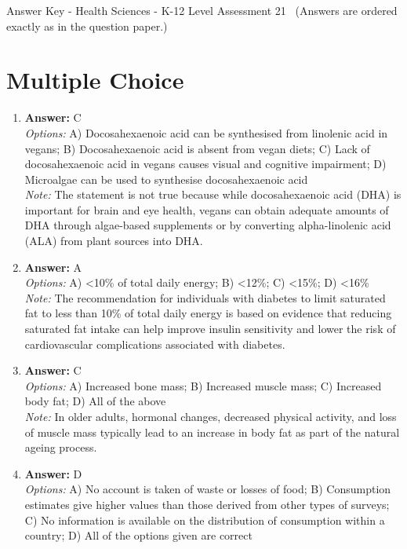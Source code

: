 \documentclass[12pt]{article}
\begin{document}
\begin{center}
Answer Key - Health Sciences - K-12 Level Assessment 21 \
\small (Answers are ordered exactly as in the question paper.)
\end{center}

\section*{Multiple Choice}
\begin{enumerate}[label=\arabic*.]
\item \textbf{Answer:} C
\\ \textit{Options:} A) Docosahexaenoic acid can be synthesised from linolenic acid in vegans; B) Docosahexaenoic acid is absent from vegan diets; C) Lack of docosahexaenoic acid in vegans causes visual and cognitive impairment; D) Microalgae can be used to synthesise docosahexaenoic acid
\\ \textit{Note:} The statement is not true because while docosahexaenoic acid (DHA) is important for brain and eye health, vegans can obtain adequate amounts of DHA through algae-based supplements or by converting alpha-linolenic acid (ALA) from plant sources into DHA.
\item \textbf{Answer:} A
\\ \textit{Options:} A) \textless{}10\% of total daily energy; B) \textless{}12\%; C) \textless{}15\%; D) \textless{}16\%
\\ \textit{Note:} The recommendation for individuals with diabetes to limit saturated fat to less than 10\% of total daily energy is based on evidence that reducing saturated fat intake can help improve insulin sensitivity and lower the risk of cardiovascular complications associated with diabetes.
\item \textbf{Answer:} C
\\ \textit{Options:} A) Increased bone mass; B) Increased muscle mass; C) Increased body fat; D) All of the above
\\ \textit{Note:} In older adults, hormonal changes, decreased physical activity, and loss of muscle mass typically lead to an increase in body fat as part of the natural ageing process.
\item \textbf{Answer:} D
\\ \textit{Options:} A) No account is taken of waste or losses of food; B) Consumption estimates give higher values than those derived from other types of surveys; C) No information is available on the distribution of consumption within a country; D) All of the options given are correct

\end{enumerate}
\end{document}
